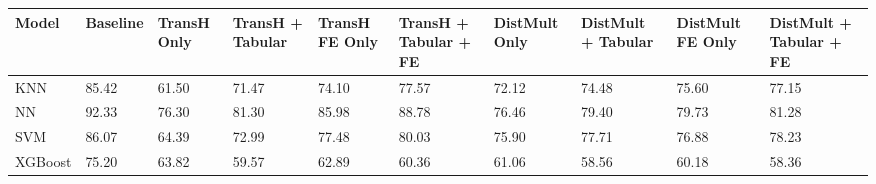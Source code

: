 \begin{tabular}{llllllllll}
\toprule
Model & Baseline & TransH Only & TransH + Tabular & TransH FE Only & TransH + Tabular + FE & DistMult Only & DistMult + Tabular & DistMult FE Only & DistMult + Tabular + FE \\
\midrule
KNN & 85.42 & 61.50 & 71.47 & 74.10 & 77.57 & 72.12 & 74.48 & 75.60 & 77.15 \\
NN & 92.33 & 76.30 & 81.30 & 85.98 & 88.78 & 76.46 & 79.40 & 79.73 & 81.28 \\
SVM & 86.07 & 64.39 & 72.99 & 77.48 & 80.03 & 75.90 & 77.71 & 76.88 & 78.23 \\
XGBoost & 75.20 & 63.82 & 59.57 & 62.89 & 60.36 & 61.06 & 58.56 & 60.18 & 58.36 \\
\bottomrule
\end{tabular}
